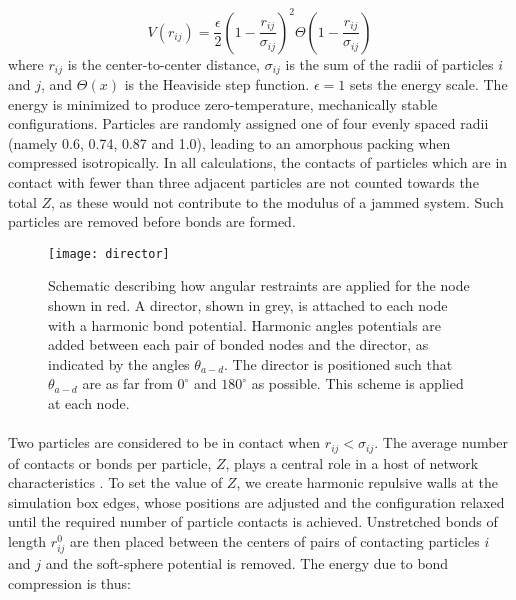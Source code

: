 \documentclass[9pt,twocolumn,twoside]{pnas-new}
\begin{document}
\begin{equation}
V(r_{ij}) = \frac{\epsilon}{2} (1-\frac{r_{ij}}{\sigma_{ij}})^{2} \Theta\left(1-\frac{r_{ij}}{\sigma_{ij}}\right)
\label{eqn:softSphere}
\end{equation}
where $r_{ij}$ is the center-to-center distance, $\sigma_{ij}$ is the sum of the radii of particles $i$ and $j$, and $\Theta(x)$ is the Heaviside step function.  $\epsilon=1$ sets the energy scale.  The energy is minimized to produce zero-temperature, mechanically stable configurations.
Particles are randomly assigned one of four evenly spaced radii (namely 0.6, 0.74, 0.87 and 1.0), leading to an amorphous packing when compressed isotropically.  In all calculations, the contacts of particles which are in contact with fewer than three adjacent particles are not counted towards the total $Z$, as these would not contribute to the modulus of a jammed system. Such particles are removed before bonds are formed.

\begin{figure}
	\centering
	\texttt{[image: director]}
	\caption{Schematic describing how angular restraints are applied for the node shown in red.  A director, shown in grey, is attached to each node with a harmonic bond potential.  Harmonic angles potentials are added between each pair of bonded nodes and the director, as indicated by the angles $\theta_{a-d}$. The director is positioned such that $\theta_{a-d}$ are as far from $0^{\circ}$ and $180^{\circ}$ as possible.  This scheme is applied at each node.}

	\label{fig:director}
\end{figure}



\paragraph{}

Two particles are considered to be in contact when $r_{ij}<\sigma_{ij}$. The average number of contacts or bonds per particle, $Z$, plays a central role in a host of network characteristics \cite{liu2010jamming,sussman2016spatial,driscoll2016role}.  To set the value of $Z$, we create harmonic repulsive walls at the simulation box edges, whose positions are adjusted and the configuration relaxed until the required number of particle contacts is achieved.  Unstretched bonds of length $r_{ij}^{0}$ are then placed between the centers of pairs of contacting particles $i$ and $j$ and the soft-sphere potential is removed.  The energy due to bond compression is thus:
\end{document}
